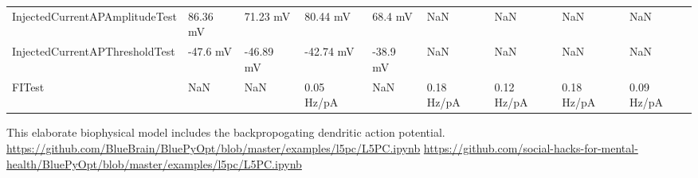 \begin{table}[ht]
{\begin{tabular}{lllllllll}
InjectedCurrentAPAmplitudeTest &                       86.36 mV &                 71.23 mV &                           80.44 mV &      68.4 mV &            NaN &            NaN &            NaN &            NaN \\
InjectedCurrentAPThresholdTest &                       -47.6 mV &                -46.89 mV &                          -42.74 mV &     -38.9 mV &            NaN &            NaN &            NaN &            NaN \\
FITest                         &                            NaN &                      NaN &                         0.05 Hz/pA &          NaN &     0.18 Hz/pA &     0.12 Hz/pA &     0.18 Hz/pA &     0.09 Hz/pA \\
\bottomrule
\end{tabular}}
\end{table}


This elaborate biophysical model includes the backpropogating dendritic action potential.
\url{https://github.com/BlueBrain/BluePyOpt/blob/master/examples/l5pc/L5PC.ipynb}
\url{https://github.com/social-hacks-for-mental-health/BluePyOpt/blob/master/examples/l5pc/L5PC.ipynb}


